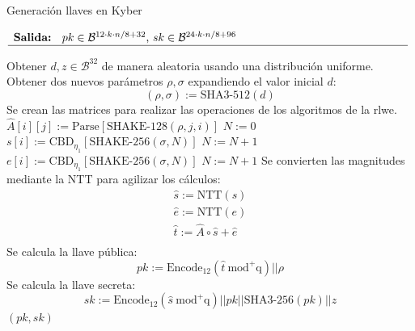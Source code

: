 \begin{algorithm}[H]
	\caption{Generación llaves en Kyber}
	$\begin{array}{p{\textwidth}}
		\textbf{Salida: } \(pk\in \mathcal{B}^{12\cdot k\cdot n/8+32}\), \(sk\in \mathcal{B}^{24\cdot k\cdot n/8+96}\) \\ 
		\hline
	\end{array}$
	\begin{algorithmic}[1]
		\State Obtener \(d, z\in\mathcal{B}^{32}\) de manera aleatoria usando una distribución uniforme.
		\State Obtener dos nuevos parámetros \(\rho, \sigma\) expandiendo el valor inicial \(d\):
		\begin{equation}
			(\rho, \sigma):=\text{SHA3-512}(d)
		\end{equation}
		\Statex Se crean las matrices para realizar las operaciones de los algoritmos de la  \gls{rlwe}.
				\State $\hat{A}[i][j]:=\text{Parse}[\text{SHAKE-128}(\rho,j,i)]$ 
			\EndFor
		\EndFor
		\State $N:=0$
			\State $s[i]:= \text{CBD}_{\eta_1}[\text{SHAKE-256}(\sigma,N)]$ 
			\State $N:= N+1$
		\EndFor
			\State $e[i]:= \text{CBD}_{\eta_1}[\text{SHAKE-256}(\sigma,N)]$ 
			\State $N:= N+1$
		\EndFor
		\State Se convierten las magnitudes mediante la NTT para agilizar los cálculos:
		\begin{equation}
				\begin{array}{l}
					\hat{s}:=\text{NTT}(s)\\
					\hat{e}:=\text{NTT}(e)\\
					\hat{t}:=\hat{A}\circ\hat{s}+\hat{e}\\
				\end{array} 	
		\end{equation}
		\State Se calcula la llave pública:
		\begin{equation}
			pk:=\text{Encode}_{12}(\hat{t}\ \text{mod}^{+}\text{q} )||\rho 
		\end{equation}
		\Statex {}
		\Statex {}
		\State Se calcula la llave secreta:
		\begin{equation}
			sk:=\text{Encode}_{12}(\hat{s}\ \text{mod}^{+}\text{q} )||pk||\text{SHA3-256}(pk)||z
		\end{equation}
		\Statex {}
		\State \Return $(pk,sk)$
	\end{algorithmic}
\end{algorithm}


